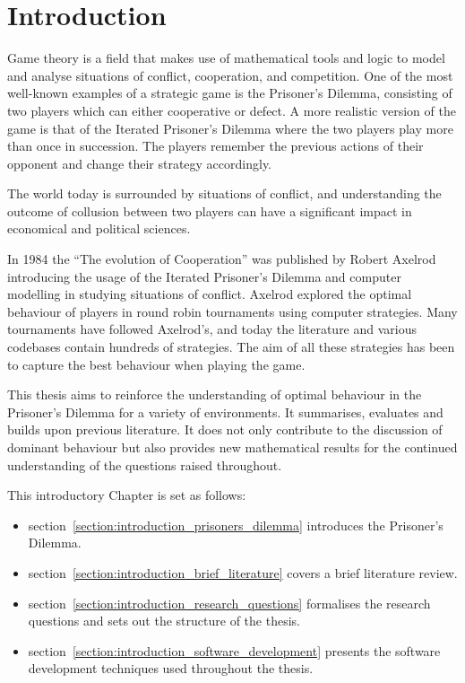 \chapter{Introduction}\label{chapter:introduction}

Game theory is a field that makes use of mathematical tools and logic to model
and analyse situations of conflict, cooperation, and competition. One of the
most well-known examples of a strategic game is the Prisoner's Dilemma,
consisting of two players which can either cooperative or defect. A more
realistic version of the game is that of the Iterated Prisoner's Dilemma where
the two players play more than once in succession. The players remember the
previous actions of their opponent and change their strategy accordingly.

The world today is surrounded by situations of conflict, and understanding the
outcome of collusion between two players can have a significant impact in
economical and political sciences.

In 1984 the ``The evolution of Cooperation'' was published by Robert Axelrod
introducing the usage of the Iterated Prisoner's Dilemma and computer modelling
in studying situations of conflict. Axelrod explored the optimal behaviour of
players in round robin tournaments using computer strategies. Many tournaments
have followed Axelrod's, and today the literature and various codebases
contain hundreds of strategies. The aim of all these strategies has been to capture
the best behaviour when playing the game.

This thesis aims to reinforce the understanding of optimal behaviour in the
Prisoner's Dilemma for a variety of environments. It summarises,
evaluates and builds upon previous literature. It does not only contribute to
the discussion of dominant behaviour but also provides new mathematical results
for the continued understanding of the questions raised throughout.

This introductory Chapter is set as follows:

\begin{itemize}
    \item section~\ref{section:introduction_prisoners_dilemma} introduces
    the Prisoner's Dilemma.
    \item section~\ref{section:introduction_brief_literature} covers a brief
    literature review.
    \item section~\ref{section:introduction_research_questions} formalises the research
    questions and sets out the structure of the thesis.
    \item section~\ref{section:introduction_software_development} presents the
    software development techniques used throughout the thesis.
\end{itemize}

